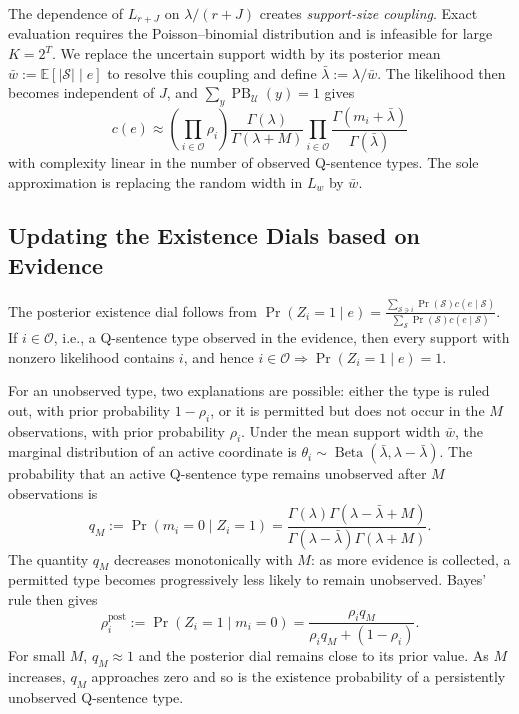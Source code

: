 \documentclass[10pt, conference, letterpaper]{ IEEEtran}
\theoremstyle{bfnote}
\begin{document}
The dependence of $L_{r+J}$ on $\lambda/(r+J)$ creates
\emph{support-size coupling}. Exact evaluation requires the
Poisson--binomial distribution and is infeasible for large $K=2^T$. We
replace the uncertain support width by its posterior mean
$\bar w:=\mathbb{E}[|\mathcal{S}|\mid e]$ to resolve this coupling and define
$
\bar{\lambda}:=\lambda/\bar w.
$
The likelihood then becomes independent of $J$, and
$\sum_{y}\operatorname{PB}_{\mathcal{U}}(y)=1$ gives
\begin{equation}
c(e)
\approx
\left(\prod_{i\in\mathcal{O}}\rho_i\right)
\frac{\Gamma(\lambda)}{\Gamma(\lambda+M)}
\prod_{i\in\mathcal{O}}
\frac{\Gamma(m_i+\bar{\lambda})}
     {\Gamma(\bar{\lambda})}
\label{eq:rsdc-optB}
\end{equation}
with complexity linear in the number of observed Q-sentence types. The sole
approximation is replacing the random width in $L_w$ by $\bar w$.

\subsection{Updating the Existence Dials based on Evidence}
\label{subsec:rsdc-dials}

The posterior existence dial follows from
$
\Pr(Z_i=1\mid e)
=
\frac{
\sum_{\mathcal{S}\ni i}
\Pr(\mathcal{S})c(e\mid\mathcal{S})
}{
\sum_{\mathcal{S}}
\Pr(\mathcal{S})c(e\mid\mathcal{S})
}.
$
If $i\in\mathcal{O}$, i.e., a Q-sentence type observed in the evidence, then every support with nonzero likelihood contains $i$,
and hence
$
i\in\mathcal{O}
\Longrightarrow
\Pr(Z_i=1\mid e)=1.
$

For an unobserved type, two explanations are possible: either the type is
ruled out, with prior probability $1-\rho_i$, or it is permitted but does
not occur in the $M$ observations, with prior probability $\rho_i$. Under
the mean support width $\bar w$, the marginal distribution of an active
coordinate is
$
    \theta_i
    \sim
    \operatorname{Beta}
    \left(
        \bar{\lambda},
        \lambda-\bar{\lambda}
    \right).
$
The probability that an active Q-sentence type remains
unobserved after $M$ observations is
\begin{equation}
\label{eq:rsdc-qN}
q_M
:=
\Pr(m_i=0\mid Z_i=1)
=
\frac{
\Gamma(\lambda)
\Gamma(\lambda-\bar{\lambda}+M)
}{
\Gamma(\lambda-\bar{\lambda})
\Gamma(\lambda+M)
}.
\end{equation}
The quantity $q_M$ decreases monotonically with $M$: as more evidence is
collected, a permitted type becomes progressively less likely to remain
unobserved. Bayes' rule then gives
\begin{equation}
\label{eq:rsdc-D3}
\rho_i^{\mathrm{post}}
:=
\Pr(Z_i=1\mid m_i=0)
=
\frac{
    \rho_i q_M
}{
    \rho_i q_M+(1-\rho_i)
}.
\end{equation}
For small $M$, $q_M\approx1$ and the posterior dial remains close to its
prior value. As $M$ increases, $q_M$ approaches zero and so is the
existence probability of a persistently unobserved Q-sentence type.
\end{document}

